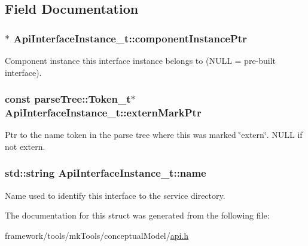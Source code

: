 \subsection{Field Documentation}
\subsubsection[{\texorpdfstring{component\+Instance\+Ptr}{componentInstancePtr}}]{$\ast$ Api\+Interface\+Instance\+\_\+t\+::component\+Instance\+Ptr}\hypertarget{struct_api_interface_instance__t_ac45a000cb15eeb38011af68a4af38b46}{}\label{struct_api_interface_instance__t_ac45a000cb15eeb38011af68a4af38b46}


Component instance this interface instance belongs to (N\+U\+LL = pre-\/built interface). 

\subsubsection[{\texorpdfstring{extern\+Mark\+Ptr}{externMarkPtr}}]{\setlength{\rightskip}{0pt plus 5cm}const {\bf parse\+Tree\+::\+Token\+\_\+t}$\ast$ Api\+Interface\+Instance\+\_\+t\+::extern\+Mark\+Ptr}\hypertarget{struct_api_interface_instance__t_a61696b734f1e0de91cfb24e5493269fd}{}\label{struct_api_interface_instance__t_a61696b734f1e0de91cfb24e5493269fd}
Ptr to the name token in the parse tree where this was marked \char`\"{}extern\char`\"{}. N\+U\+LL if not extern. 
\subsubsection[{\texorpdfstring{name}{name}}]{\setlength{\rightskip}{0pt plus 5cm}std\+::string Api\+Interface\+Instance\+\_\+t\+::name}\hypertarget{struct_api_interface_instance__t_a57a4147c979e5432ed05c35146314401}{}\label{struct_api_interface_instance__t_a57a4147c979e5432ed05c35146314401}


Name used to identify this interface to the service directory. 



The documentation for this struct was generated from the following file\+:\begin{DoxyCompactItemize}
\item 
framework/tools/mk\+Tools/conceptual\+Model/\hyperlink{api_8h}{api.\+h}\end{DoxyCompactItemize}

